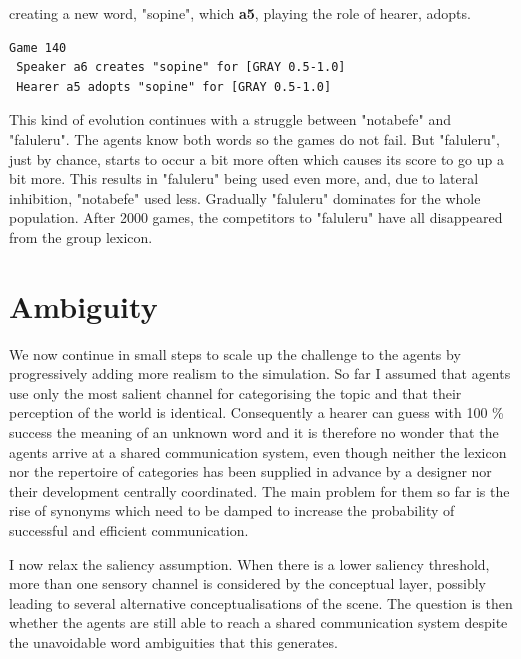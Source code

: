 creating a new word, "sopine", which {\bf a5}, playing
the role of hearer, adopts. 
\begin{verbatim}
Game 140
 Speaker a6 creates "sopine" for [GRAY 0.5-1.0]
 Hearer a5 adopts "sopine" for [GRAY 0.5-1.0]
\end{verbatim}
This kind of evolution continues with a struggle between 
"notabefe" and "faluleru". The agents know both 
words so the games do not fail. But "faluleru", 
just by chance, starts to occur a bit more often
which causes its score to go up a bit more. 
This results in "faluleru" being used even more, 
and, due to lateral inhibition, "notabefe" used 
less. Gradually "faluleru" dominates for 
the whole population. 
After 2000 games, the competitors to "faluleru" have 
all disappeared from the group lexicon. 

\section{Ambiguity} 

We now continue in small steps to scale up the
challenge to the agents by progressively 
adding more realism to the simulation. So far I 
assumed that agents use only 
the most salient channel for categorising the topic
and that their perception of the world is identical.
Consequently a hearer can guess with 100 \% success the
meaning of an unknown word and 
it is therefore no wonder that the agents arrive at a 
shared communication system, 
even though neither the lexicon nor the repertoire
of categories has been supplied in advance by a 
designer nor their development centrally
coordinated. The main problem for them so far is 
the rise of synonyms which need to be damped to 
increase the probability of successful and 
efficient communication. 

I now relax the saliency assumption. When 
there is a lower saliency threshold, more than one
sensory channel is considered by the conceptual 
layer, possibly leading to several alternative
conceptualisations of the scene. The question is 
then whether the agents are still able to reach 
a shared communication system despite the unavoidable
word ambiguities that this generates. 

